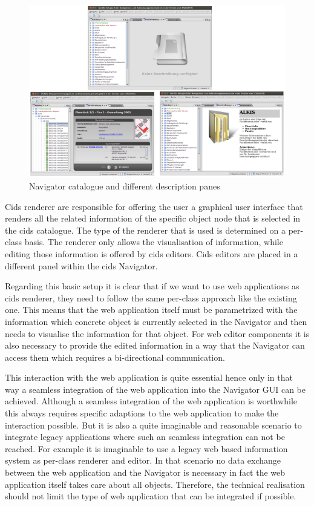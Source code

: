 \begin{figure}
	\centering \includegraphics[width=1.0\textwidth]{./img/conception/desc_panes.png}
	\caption{Navigator catalogue and different description panes}
	\label{fig:desc_panes}
\end{figure}

Cids renderer are responsible for offering the user a graphical user interface that renders all the related information of the specific object node that is selected in the cids catalogue.
The type of the renderer that is used is determined on a per-class basis.
The renderer only allows the visualisation of information, while editing those information is offered by cids editors.
Cids editors are placed in a different panel within the cids Navigator.

Regarding this basic setup it is clear that if we want to use web applications as cids renderer, they need to follow the same per-class approach like the existing one.
This means that the web application itself must be parametrized with the information which concrete object is currently selected in the Navigator and then needs to visualise the information for that object.
For web editor components it is also necessary to provide the edited information in a way that the Navigator can access them which requires a bi-directional communication.

This interaction with the web application is quite essential hence only in that way a seamless integration of the web application into the Navigator GUI can be achieved.
Although a seamless integration of the web application is worthwhile this always requires specific adaptions to the web application to make the interaction possible.
But it is also a quite imaginable and reasonable scenario to integrate legacy applications where such an seamless integration can not be reached.
For example it is imaginable to use a legacy web based information system as per-class renderer and editor.
In that scenario no data exchange between the web application and the Navigator is necessary in fact the web application itself takes care about all objects.
Therefore, the technical realisation should not limit the type of web application that can be integrated if possible.


